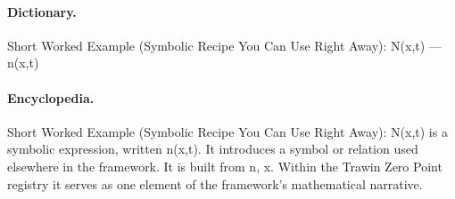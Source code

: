 \paragraph{Dictionary.}
Short Worked Example (Symbolic Recipe You Can Use Right Away): N(x,t) — n(x,t)

\paragraph{Encyclopedia.}
Short Worked Example (Symbolic Recipe You Can Use Right Away): N(x,t) is a symbolic expression, written n(x,t). It introduces a symbol or relation used elsewhere in the framework. It is built from n, x. Within the Trawin Zero Point registry it serves as one element of the framework's mathematical narrative.
